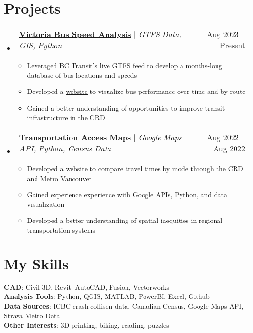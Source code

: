 \documentclass[letterpaper,11pt]{article}
\makeatletter
\newcommand{\resumeItem}[1]{
  \item\small{
    {#1 \vspace{-2pt}}
  }
}
\newcommand{\resumeProjectHeading}[2]{
    \item
    \begin{tabular*}{0.97\textwidth}{l@{\extracolsep{\fill}}r}
      \small#1 & #2 \\
    \end{tabular*}\vspace{-7pt}
}
\newcommand{\resumeSubHeadingListStart}{\begin{itemize}[leftmargin=0.15in, label={}]}
\newcommand{\resumeSubHeadingListEnd}{\end{itemize}}
\newcommand{\resumeItemListStart}{\begin{itemize}}
\newcommand{\resumeItemListEnd}{\end{itemize}\vspace{-5pt}}
\makeatother
\begin{document}
\section{Projects}
    \resumeSubHeadingListStart
      \resumeProjectHeading
          {\href{https://markedwardson.me/Victoria-Bus-Speed-and-Reliablity-Analysis/}{\underline{\textbf{Victoria Bus Speed Analysis}}} $|$ \emph{GTFS Data, GIS,  Python}}{Aug 2023 -- Present}
          \resumeItemListStart
            \resumeItem{Leveraged BC Transit's live GTFS feed to develop a months-long database of bus locations and speeds}
            \resumeItem{Developed a \href{https://markedwardson.me/Victoria-Bus-Speed-and-Reliablity-Analysis/}{\underline{website}} to visualize bus performance over time and by route}
            \resumeItem{Gained a better understanding of opportunities to improve transit infrastructure in the CRD}
          \resumeItemListEnd
      \resumeProjectHeading
          {\href{https://markedwardson.me/transit-access-map/victoria.html}{\underline{\textbf{Transportation Access Maps}}} $|$ \emph{Google Maps API, Python, Census Data}}{Aug 2022 -- Aug 2022}
          \resumeItemListStart
            \resumeItem{Developed a \href{https://markedwardson.me/transit-access-map/victoria.html}{\underline{website}} to compare travel times by mode through the CRD and Metro Vancouver}
            \resumeItem{Gained experience experience with Google APIs, Python, and data visualization}
            \resumeItem{Developed a better understanding of spatial inequities in regional transportation systems}
            
          \resumeItemListEnd
    \resumeSubHeadingListEnd



%
\section{My Skills}
 \begin{itemize}[leftmargin=0.15in, label={}]
    \small{\item{
     \textbf{CAD}{: Civil 3D, Revit, AutoCAD, Fusion, Vectorworks} \\
     \textbf{Analysis Tools}{: Python, QGIS, MATLAB, PowerBI, Excel, Github} \\
     \textbf{Data Sources}{: ICBC crash collison data, Canadian Census, Google Maps API, Strava Metro Data} \\
    \textbf{Other Interests}{: 3D printing, biking, reading, puzzles}
    }}
    
 \end{itemize}


\end{document}

